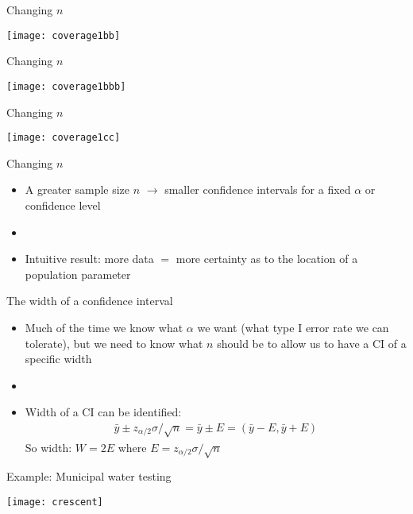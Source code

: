 \documentclass[xcolor=dvipsnames]{beamer}
\begin{document}
\begin{frame}{Changing $n$}
\begin{center}
	\texttt{[image: coverage1bb]}
\end{center}
\end{frame}

\begin{frame}{Changing $n$}
\begin{center}
	\texttt{[image: coverage1bbb]}
\end{center}
\end{frame}

\begin{frame}{Changing $n$}
\begin{center}
	\texttt{[image: coverage1cc]}
\end{center}
\end{frame}

\begin{frame}{Changing $n$}
\begin{itemize}
		\item A greater sample size $n$ $\rightarrow$ smaller confidence intervals for a fixed $\alpha$ or confidence level  \pause
	\item[]
	\item Intuitive result: more data $=$ more certainty as to the location of a population parameter
\end{itemize}
\end{frame}

\begin{frame}{The width of a confidence interval}
	\begin{itemize}
		\item Much of the time we know what $\alpha$ we want (what type I error rate we can tolerate), but we need to know what $n$ should be to allow us to have a CI of a specific width  \pause
		\item[]
		\item Width of a CI can be identified:
		\begin{align*}
			\bar{y}\pm z_{\alpha/2} \sigma / \sqrt{n} = \bar{y} \pm E = (\bar{y}-E, \bar{y}+E)
		\end{align*}  \pause
		So width: $W = 2E$ where $E = z_{\alpha/2} \sigma  /\sqrt{n}$
	\end{itemize}
\end{frame}

\begin{frame}{Example: Municipal water testing}
	\begin{center}
		\texttt{[image: crescent]}
	\end{center}
\end{frame}
\end{document}
